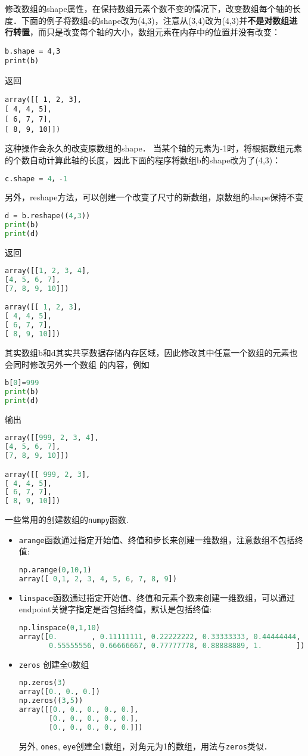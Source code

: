 修改数组的shape属性，在保持数组元素个数不变的情况下，改变数组每个轴的长度．下面的例子将数组c的shape改为(4,3)，注意从(3,4)改为(4,3)并\textbf{不是对数组进行转置}，而只是改变每个轴的大小，数组元素在内存中的位置并没有改变：
\begin{lstlisting}
b.shape = 4,3
print(b)
\end{lstlisting}
返回
\begin{lstlisting}
array([[ 1, 2, 3],
[ 4, 4, 5],
[ 6, 7, 7],
[ 8, 9, 10]])
\end{lstlisting}
这种操作会永久的改变原数组的shape． 当某个轴的元素为-1时，将根据数组元素的个数自动计算此轴的长度，因此下面的程序将数组b的shape改为了(4,3)：
\begin{lstlisting}[language=python]
c.shape = 4，-1
\end{lstlisting}
另外，reshape方法，可以创建一个改变了尺寸的新数组，原数组的shape保持不变
\begin{lstlisting}[language=python]
d = b.reshape((4,3))
print(b)
print(d)
\end{lstlisting}
返回
\begin{lstlisting}[language=python]
array([[1, 2, 3, 4],
[4, 5, 6, 7],
[7, 8, 9, 10]])

array([[ 1, 2, 3],
[ 4, 4, 5],
[ 6, 7, 7],
[ 8, 9, 10]])
\end{lstlisting}
其实数组b和d其实共享数据存储内存区域，因此修改其中任意一个数组的元素也会同时修改另外一个数组
的内容，例如
\begin{lstlisting}[language=python]
b[0]=999
print(b)
print(d)
\end{lstlisting}
输出
\begin{lstlisting}[language=python]
array([[999, 2, 3, 4],
[4, 5, 6, 7],
[7, 8, 9, 10]])

array([[ 999, 2, 3],
[ 4, 4, 5],
[ 6, 7, 7],
[ 8, 9, 10]])
\end{lstlisting}


一些常用的创建数组的\verb|numpy|函数.

\begin{itemize}
\item \verb|arange|函数通过指定开始值、终值和步长来创建一维数组，注意数组不包括终值:
\begin{lstlisting}[language=python]
np.arange(0,10,1)
array([ 0,1, 2, 3, 4, 5, 6, 7, 8, 9])
\end{lstlisting}
\item \verb|linspace|函数通过指定开始值、终值和元素个数来创建一维数组，可以通过endpoint关键字指定是否包括终值，默认是包括终值:
 \begin{lstlisting}[language=python]
np.linspace(0,1,10)
array([0.        , 0.11111111, 0.22222222, 0.33333333, 0.44444444,
       0.55555556, 0.66666667, 0.77777778, 0.88888889, 1.        ])
 \end{lstlisting}
\item \verb|zeros| 创建全0数组
\begin{lstlisting}[language=python]
np.zeros(3)
array([0., 0., 0.])
np.zeros((3,5))
array([[0., 0., 0., 0., 0.],
       [0., 0., 0., 0., 0.],
       [0., 0., 0., 0., 0.]])
\end{lstlisting} 
另外, \verb|ones|, \verb|eye|创建全1数组，对角元为1的数组，用法与\verb|zeros|类似．
\end{itemize}

